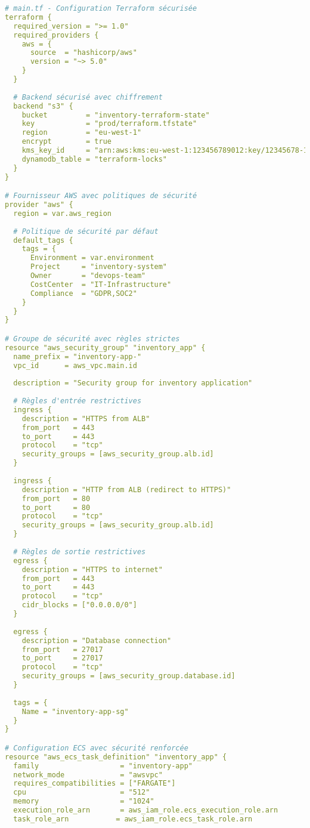 \documentclass[12pt,a4paper]{report}
\begin{document}
\begin{lstlisting}[language=YAML, caption=Infrastructure as Code sécurisée avec Terraform]
# main.tf - Configuration Terraform sécurisée
terraform {
  required_version = ">= 1.0"
  required_providers {
    aws = {
      source  = "hashicorp/aws"
      version = "~> 5.0"
    }
  }
  
  # Backend sécurisé avec chiffrement
  backend "s3" {
    bucket         = "inventory-terraform-state"
    key            = "prod/terraform.tfstate"
    region         = "eu-west-1"
    encrypt        = true
    kms_key_id     = "arn:aws:kms:eu-west-1:123456789012:key/12345678-1234-1234-1234-123456789012"
    dynamodb_table = "terraform-locks"
  }
}

# Fournisseur AWS avec politiques de sécurité
provider "aws" {
  region = var.aws_region
  
  # Politique de sécurité par défaut
  default_tags {
    tags = {
      Environment = var.environment
      Project     = "inventory-system"
      Owner       = "devops-team"
      CostCenter  = "IT-Infrastructure"
      Compliance  = "GDPR,SOC2"
    }
  }
}

# Groupe de sécurité avec règles strictes
resource "aws_security_group" "inventory_app" {
  name_prefix = "inventory-app-"
  vpc_id      = aws_vpc.main.id
  
  description = "Security group for inventory application"
  
  # Règles d'entrée restrictives
  ingress {
    description = "HTTPS from ALB"
    from_port   = 443
    to_port     = 443
    protocol    = "tcp"
    security_groups = [aws_security_group.alb.id]
  }
  
  ingress {
    description = "HTTP from ALB (redirect to HTTPS)"
    from_port   = 80
    to_port     = 80
    protocol    = "tcp"
    security_groups = [aws_security_group.alb.id]
  }
  
  # Règles de sortie restrictives
  egress {
    description = "HTTPS to internet"
    from_port   = 443
    to_port     = 443
    protocol    = "tcp"
    cidr_blocks = ["0.0.0.0/0"]
  }
  
  egress {
    description = "Database connection"
    from_port   = 27017
    to_port     = 27017
    protocol    = "tcp"
    security_groups = [aws_security_group.database.id]
  }
  
  tags = {
    Name = "inventory-app-sg"
  }
}

# Configuration ECS avec sécurité renforcée
resource "aws_ecs_task_definition" "inventory_app" {
  family                   = "inventory-app"
  network_mode             = "awsvpc"
  requires_compatibilities = ["FARGATE"]
  cpu                      = "512"
  memory                   = "1024"
  execution_role_arn       = aws_iam_role.ecs_execution_role.arn
  task_role_arn           = aws_iam_role.ecs_task_role.arn
  

\end{lstlisting}
\end{document}
